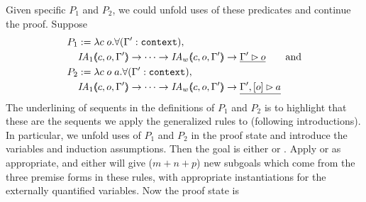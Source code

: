 Given specific $P_1$ and $P_2$, we could unfold uses of these predicates and continue the proof.
Suppose
\begin{align*}
P_1 &:= \lambda c \; o . \forall (\inddyncon{} : \sltm{context}), \\
& \mathit{IA}_1 \args{c,o,\inddyncon{}} \rightarrow \dots \rightarrow \mathit{IA}_w \args{c,o,\inddyncon{}} \rightarrow \underline{\seqsl[\inddyncon{}]{o}} \qquad \mathrm{and}\\
P_2 &:= \lambda c \; o \; a . \forall (\inddyncon{} : \sltm{context}), \\
& \mathit{IA}_1 \args{c,o,\inddyncon{}} \rightarrow \dots \rightarrow \mathit{IA}_w \args{c,o,\inddyncon{}} \rightarrow \underline{\bchsl[\inddyncon{}]{o}{a}}
\end{align*}
The underlining of sequents in the definitions of $P_1$ and $P_2$ is
to highlight that these are the sequents we apply the generalized
rules to (following introductions). In particular, we unfold uses of
$P_1$ and $P_2$ in the proof state and introduce the variables and
induction assumptions.  Then the goal is either
 or . Apply
 or  as appropriate, and either will give
($m + n + p$) new subgoals which come from the three premise forms in
these rules, with appropriate instantiations for the externally
quantified variables. Now the proof state is
